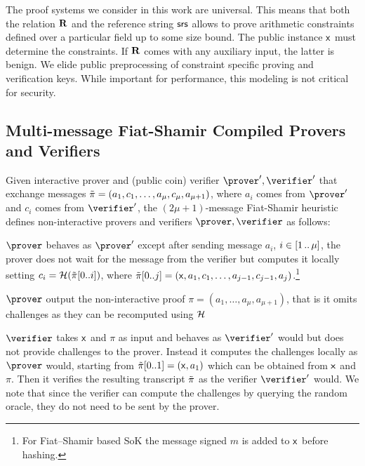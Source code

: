  The proof systems we consider in this work are universal. This means that both the relation $\mathbf{R}$ and the reference string $\mathsf{srs}$ allows to prove arithmetic constraints defined over a particular field up to some size bound. The public instance $\mathsf{x}$ must determine the constraints. 
If $\mathbf{R}$ comes with any auxiliary input, the latter is benign. 
We elide public preprocessing of constraint specific proving and verification keys. While important for performance, this modeling is not critical for security.


\subsection{Multi-message Fiat-Shamir Compiled Provers and Verifiers}
Given interactive prover and (public coin) verifier $\prover', \verifier'$ that exchange messages $\tilde{\pi} = (a_1, c_1, \ldots, a_{\mu}, c_{\mu}, a_{\mu + 1})$, where $a_i$ comes from
$\prover'$ and $c_i$ comes from $\verifier'$, the $(2\mu + 1)$-message Fiat-Shamir heuristic defines non-interactive provers and verifiers $\prover, \verifier$ as follows:

\begin{compactitem}
	\item $\prover$ behaves as $\prover'$ except after sending message
	  $a_i$, $i \in [1 \, .. \, \mu]$, the prover does not wait for
	  the message from the verifier but computes it locally setting $c_i
	  = \mathcal{H}(\tilde{\pi}[0..i])$, where $\tilde{\pi}[0..j] = (\mathsf{x}, a_1, c_1, \ldots,
	  a_{j - 1}, c_{j - 1}, a_j)$.\footnote{For Fiat--Shamir based SoK the message signed $m$ is added to $\mathsf{x}$ before hashing.} 
	  
	  $\prover$ output the non-interactive proof $\pi=(a_1,\ldots, a_{\mu}, a_{\mu + 1})$, that is it omits challenges as they can be recomputed using $\mathcal{H}$

	\item $\verifier$ takes $\mathsf{x}$ and $\pi$ as input and behaves as $\verifier'$ would but does not provide
	  challenges to the prover. Instead it computes the
	  challenges locally as $\prover$ would, starting from $\tilde{\pi}[0..1]=(\mathsf{x},a_1)$ which can be obtained from $\mathsf{x}$ and $\pi$. Then it verifies the
	  resulting transcript $\tilde{\pi}$ as the verifier $\verifier'$ would. We note that since the verifier can compute the challenges by querying the random oracle, they do not need to be sent by the prover.
	\end{compactitem}



